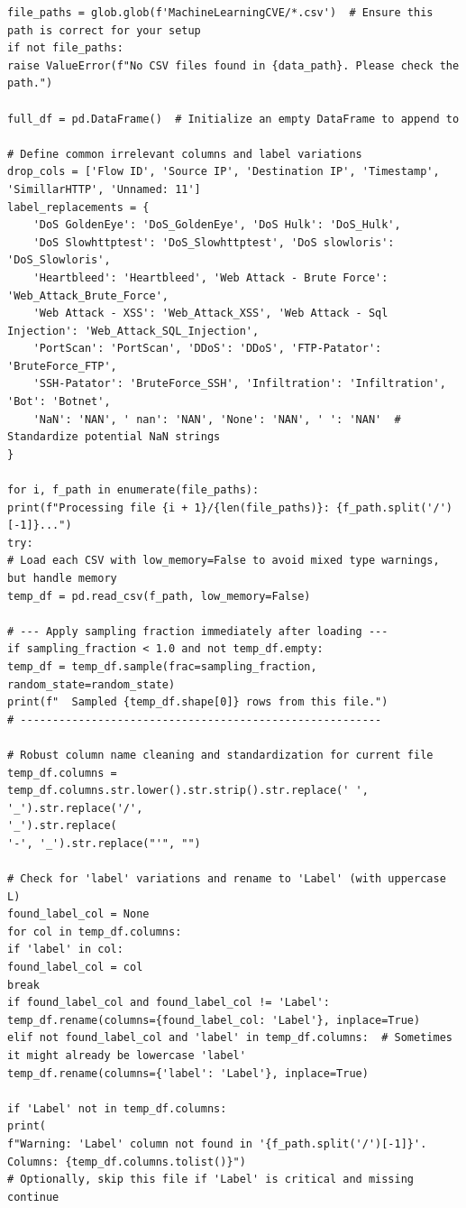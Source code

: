 \begin{lstlisting}[caption={Complete pipeline of XGBoost using CIC-IDS2017 in NIDS using Python}, label={lst:python-pipeline}]
file_paths = glob.glob(f'MachineLearningCVE/*.csv')  # Ensure this path is correct for your setup
if not file_paths:
raise ValueError(f"No CSV files found in {data_path}. Please check the path.")

full_df = pd.DataFrame()  # Initialize an empty DataFrame to append to

# Define common irrelevant columns and label variations
drop_cols = ['Flow ID', 'Source IP', 'Destination IP', 'Timestamp', 'SimillarHTTP', 'Unnamed: 11']
label_replacements = {
	'DoS GoldenEye': 'DoS_GoldenEye', 'DoS Hulk': 'DoS_Hulk',
	'DoS Slowhttptest': 'DoS_Slowhttptest', 'DoS slowloris': 'DoS_Slowloris',
	'Heartbleed': 'Heartbleed', 'Web Attack - Brute Force': 'Web_Attack_Brute_Force',
	'Web Attack - XSS': 'Web_Attack_XSS', 'Web Attack - Sql Injection': 'Web_Attack_SQL_Injection',
	'PortScan': 'PortScan', 'DDoS': 'DDoS', 'FTP-Patator': 'BruteForce_FTP',
	'SSH-Patator': 'BruteForce_SSH', 'Infiltration': 'Infiltration', 'Bot': 'Botnet',
	'NaN': 'NAN', ' nan': 'NAN', 'None': 'NAN', ' ': 'NAN'  # Standardize potential NaN strings
}

for i, f_path in enumerate(file_paths):
print(f"Processing file {i + 1}/{len(file_paths)}: {f_path.split('/')[-1]}...")
try:
# Load each CSV with low_memory=False to avoid mixed type warnings, but handle memory
temp_df = pd.read_csv(f_path, low_memory=False)

# --- Apply sampling fraction immediately after loading ---
if sampling_fraction < 1.0 and not temp_df.empty:
temp_df = temp_df.sample(frac=sampling_fraction, random_state=random_state)
print(f"  Sampled {temp_df.shape[0]} rows from this file.")
# --------------------------------------------------------

# Robust column name cleaning and standardization for current file
temp_df.columns = temp_df.columns.str.lower().str.strip().str.replace(' ', '_').str.replace('/',
'_').str.replace(
'-', '_').str.replace("'", "")

# Check for 'label' variations and rename to 'Label' (with uppercase L)
found_label_col = None
for col in temp_df.columns:
if 'label' in col:
found_label_col = col
break
if found_label_col and found_label_col != 'Label':
temp_df.rename(columns={found_label_col: 'Label'}, inplace=True)
elif not found_label_col and 'label' in temp_df.columns:  # Sometimes it might already be lowercase 'label'
temp_df.rename(columns={'label': 'Label'}, inplace=True)

if 'Label' not in temp_df.columns:
print(
f"Warning: 'Label' column not found in '{f_path.split('/')[-1]}'. Columns: {temp_df.columns.tolist()}")
# Optionally, skip this file if 'Label' is critical and missing
continue


\end{lstlisting}
